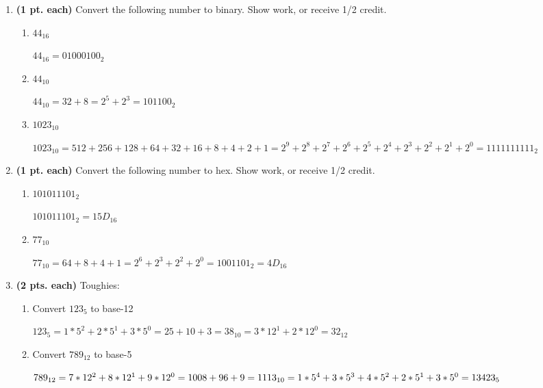\begin{enumerate}
\item \textbf{ (1 pt. each)} Convert the following number to binary. Show 
work, or receive 1/2 credit.
	\begin{enumerate}
	\item $44_{16}$
	\begin{onlysolution}	\itshape $44_{16} =0100 0100_2$\end{onlysolution}
	
	\item $44_{10}$
	\begin{onlysolution}	\itshape $44_{10} = 32+8 = 2^5+2^3=101100_2$\end{onlysolution}
	
	\item $1023_{10}$
	\begin{onlysolution}	\itshape$1023_{10} = 512+256+128+64+32+16+8+4+2+1=
        2^9+2^8+2^7+2^6+2^5+2^4+2^3+2^2+2^1+2^0=1111111111_2$\end{onlysolution}
        
	\end{enumerate}


\item \textbf{ (1 pt. each)} Convert the following number to hex. Show work, or receive 1/2 credit.
	\begin{enumerate}
	
	\item $101011101_2$
	\begin{onlysolution}	\itshape$1 0101 1101_2 = 15D_{16}$ \end{onlysolution}
	
	\item $77_{10}$
	\begin{onlysolution}	\itshape $77_{10} = 64+8+4+1=2^6+2^3+2^2+2^0=100 1101_2=4D_{16}$ \end{onlysolution}
	
	\end{enumerate}


\item \textbf{ (2 pts. each)} Toughies:
	\begin{enumerate}
	\item Convert $123_5$ to base-12
	\begin{onlysolution} 	\itshape
		$123_5 = 1*5^2 + 2*5^1 + 3*5^0 = 25+10+3=38_{10}=
        3*12^1 + 2*12^0 = 32_{12}$ \end{onlysolution}
        
	\item Convert $789_{12}$ to base-5
	\begin{onlysolution}
	\itshape	$789_{12} = 7*12^2+8*12^1+9*12^0=1008+96+9=1113_{10}= \\
        1*5^4+3*5^3 + 4*5^2 + 2*5^1 + 3*5^0 = 13423_5$ \end{onlysolution}
        

\end{enumerate}
\end{enumerate}
